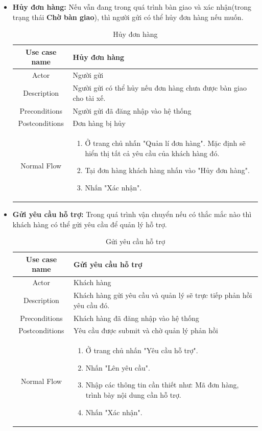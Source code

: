 \begin{itemize}
\begin{itemize}
			\item \textbf{Hủy đơn hàng:} Nếu vẫn đang trong quá trình bàn giao và xác nhận(trong trạng thái \textbf{Chờ bàn giao}), thì người gửi có thể hủy đơn hàng nếu muốn.
			
			
			\begin{table}[H]
				\centering\begin{tabular}{|c|m{25em}|}
					\hline 
					Use case name & Hủy đơn hàng\\ 
					\hline 
					Actor & Người gửi \\ 
					\hline
					Description & Người gửi có thể hủy nếu đơn hàng chưa được bàn giao cho tài xế. \\
					\hline 
					Preconditions & Người gửi đã đăng nhập vào hệ thống \\
					\hline
					Postconditions & Đơn hàng bị hủy \\
					\hline
					Normal Flow & \begin{enumerate}
						\item Ở trang chủ nhấn "Quản lí đơn hàng". Mặc định sẽ hiển thị tất cả yêu cầu của khách hàng đó.
						\item Tại đơn hàng khách hàng nhấn vào "Hủy đơn hàng".
						\item Nhấn "Xác nhận".
					\end{enumerate}
					\\
					\hline
				\end{tabular}
				\caption{Hủy đơn hàng}
			\end{table}
			
			\item \textbf{Gửi yêu cầu hỗ trợ:} Trong quá trình vận chuyển nếu có thắc mắc nào thì khách hàng có thể gửi yêu cầu để quản lý hỗ trợ.
			
			\begin{table}[H]
				\centering\begin{tabular}{|c|m{25em}|}
					\hline 
					Use case name & Gửi yêu cầu hỗ trợ\\ 
					\hline 
					Actor & Khách hàng \\ 
					\hline
					Description & Khách hàng gửi yêu cầu và quản lý sẽ trực tiếp phản hồi yêu cầu đó. \\
					\hline 
					Preconditions & Khách hàng đã đăng nhập vào hệ thống \\
					\hline
					Postconditions & Yêu cầu được submit và chờ quản lý phản hồi \\
					\hline
					Normal Flow & \begin{enumerate}
						\item Ở trang chủ nhấn "Yêu cầu hỗ trợ".
						\item Nhấn "Lên yêu cầu".
						\item Nhập các thông tin cần thiết như: Mã đơn hàng, trình bày nội dung cần hỗ trợ.
						\item Nhấn "Xác nhận".
					\end{enumerate}
					\\
					\hline
				\end{tabular}
				\caption{Gửi yêu cầu hỗ trợ}
			\end{table}
		

\end{itemize}
\end{itemize}
